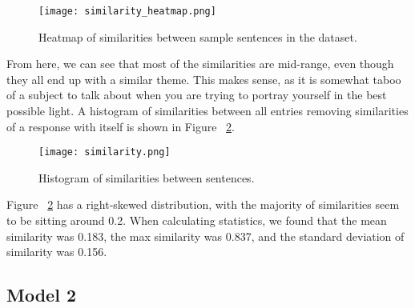 \documentclass[times, twocolumn]{article}
\begin{document}
\begin{figure}
    \centering
    \texttt{[image: similarity\_heatmap.png]}
    \caption{Heatmap of similarities between sample sentences in the dataset.}
    \label{fig:similarity_heatmap}
\end{figure}

From here, we can see that most of the similarities are mid-range, even though
they all end up with a similar theme. This makes sense, as it is somewhat taboo
of a subject to talk about when you are trying to portray yourself in the best
possible light. A histogram of similarities between all entries removing
similarities of a response with itself is shown in Figure ~\ref{fig:similarity_hist}.

\begin{figure}
    \centering
    \texttt{[image: similarity.png]}
    \caption{Histogram of similarities between sentences.}
    \label{fig:similarity_hist}
\end{figure}

Figure ~\ref{fig:similarity_hist} has a right-skewed distribution, with the
majority of similarities seem to be sitting around 0.2. When calculating statistics,
we found that the mean similarity was 0.183, the max similarity was 0.837,
and the standard deviation of similarity was 0.156.

\subsection{Model 2}
\end{document}
